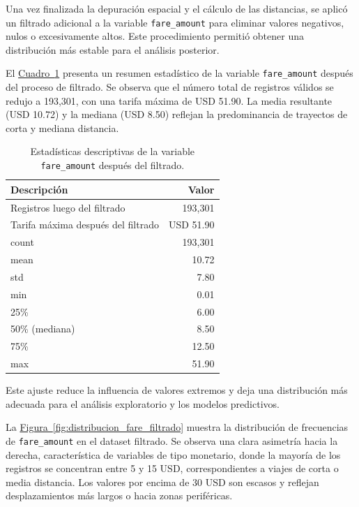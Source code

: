 \documentclass[10pt]{article}
\newcommand{\cuadroref}[1]{\hyperref[#1]{Cuadro~\ref*{#1}}}
\newcommand{\figuraref}[1]{\hyperref[#1]{Figura~\ref*{#1}}}
\begin{document}
	Una vez finalizada la depuración espacial y el cálculo de las distancias, se aplicó un filtrado adicional a la variable \texttt{fare\_amount} para eliminar valores negativos, nulos o excesivamente altos. Este procedimiento permitió obtener una distribución más estable para el análisis posterior.

	El \cuadroref{tab:fare_filtrada} presenta un resumen estadístico de la variable \texttt{fare\_amount} después del proceso de filtrado. Se observa que el número total de registros válidos se redujo a 193{,}301, con una tarifa máxima de USD 51.90. La media resultante (USD 10.72) y la mediana (USD 8.50) reflejan la predominancia de trayectos de corta y mediana distancia.

	\begin{table}[!htbp]
		\centering
		\caption{Estadísticas descriptivas de la variable \texttt{fare\_amount} después del filtrado.}
		\label{tab:fare_filtrada}
		\begin{tabular}{lr}
			\hline
			\textbf{Descripción} & \textbf{Valor} \\
			\hline
			Registros luego del filtrado & 193{,}301 \\
			Tarifa máxima después del filtrado & USD 51.90 \\
			\hline
			count & 193{,}301 \\
			mean & 10.72 \\
			std & 7.80 \\
			min & 0.01 \\
			25\% & 6.00 \\
			50\% (mediana) & 8.50 \\
			75\% & 12.50 \\
			max & 51.90 \\
			\hline
		\end{tabular}
	\end{table}

	Este ajuste reduce la influencia de valores extremos y deja una distribución más adecuada para el análisis exploratorio y los modelos predictivos.

	La \figuraref{fig:distribucion_fare_filtrado} muestra la distribución de frecuencias de \texttt{fare\_amount} en el dataset filtrado. Se observa una clara asimetría hacia la derecha, característica de variables de tipo monetario, donde la mayoría de los registros se concentran entre 5 y 15 USD, correspondientes a viajes de corta o media distancia. Los valores por encima de 30 USD son escasos y reflejan desplazamientos más largos o hacia zonas periféricas.
\end{document}
